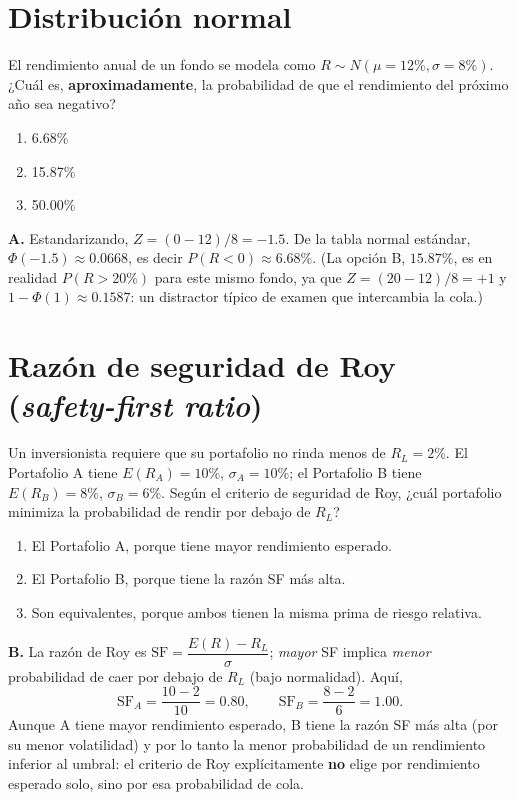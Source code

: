 \documentclass[11pt,a4paper,oneside]{article}
\theoremstyle{definition}
\begin{document}
\section{Distribución normal}

\begin{cfaBox}
El rendimiento anual de un fondo se modela como
$R\sim N(\mu=12\%,\sigma=8\%)$. ¿Cuál es, \textbf{aproximadamente}, la
probabilidad de que el rendimiento del próximo año sea negativo?
\begin{enumerate}[label=\Alph*.]
\item 6.68\%
\item 15.87\%
\item 50.00\%
\end{enumerate}
\end{cfaBox}
\begin{solBox}
\textbf{A.} Estandarizando, $Z=(0-12)/8=-1.5$. De la tabla normal
estándar, $\Phi(-1.5)\approx0.0668$, es decir $P(R<0)\approx6.68\%$.
(La opción B, $15.87\%$, es en realidad $P(R>20\%)$ para este mismo
fondo, ya que $Z=(20-12)/8=+1$ y $1-\Phi(1)\approx0.1587$: un distractor
típico de examen que intercambia la cola.)
\end{solBox}

\section{Razón de seguridad de Roy (\emph{safety-first ratio})}

\begin{cfaBox}
Un inversionista requiere que su portafolio no rinda menos de
$R_L=2\%$. El Portafolio A tiene $E(R_A)=10\%$, $\sigma_A=10\%$; el
Portafolio B tiene $E(R_B)=8\%$, $\sigma_B=6\%$. Según el criterio de
seguridad de Roy, ¿cuál portafolio minimiza la probabilidad de rendir por
debajo de $R_L$?
\begin{enumerate}[label=\Alph*.]
\item El Portafolio A, porque tiene mayor rendimiento esperado.
\item El Portafolio B, porque tiene la razón SF más alta.
\item Son equivalentes, porque ambos tienen la misma prima de riesgo relativa.
\end{enumerate}
\end{cfaBox}
\begin{solBox}
\textbf{B.} La razón de Roy es
$\mathrm{SF}=\dfrac{E(R)-R_L}{\sigma}$; \emph{mayor} SF implica \emph{menor}
probabilidad de caer por debajo de $R_L$ (bajo normalidad). Aquí,
\[
\mathrm{SF}_A=\frac{10-2}{10}=0.80, \qquad \mathrm{SF}_B=\frac{8-2}{6}=1.00.
\]
Aunque A tiene mayor rendimiento esperado, B tiene la razón SF más alta
(por su menor volatilidad) y por lo tanto la menor probabilidad de un
rendimiento inferior al umbral: el criterio de Roy explícitamente
\textbf{no} elige por rendimiento esperado solo, sino por esa probabilidad
de cola.
\end{solBox}
\end{document}
